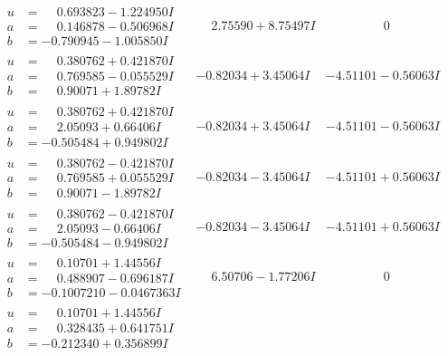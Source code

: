 \documentclass[1p]{elsarticle_modified}
\theoremstyle{definition}
\begin{document}
$$\begin{array}{c|c|c}
\begin{aligned}
u &= \phantom{-}0.693823 - 1.224950 I \\
a &= \phantom{-}0.146878 - 0.506968 I \\
b &= -0.790945 - 1.005850 I\end{aligned}
 & \phantom{-}2.75590 + 8.75497 I & \phantom{-0.000000 } 0 \\ \hline\begin{aligned}
u &= \phantom{-}0.380762 + 0.421870 I \\
a &= \phantom{-}0.769585 - 0.055529 I \\
b &= \phantom{-}0.90071 + 1.89782 I\end{aligned}
 & -0.82034 + 3.45064 I & -4.51101 - 0.56063 I \\ \hline\begin{aligned}
u &= \phantom{-}0.380762 + 0.421870 I \\
a &= \phantom{-}2.05093 + 0.66406 I \\
b &= -0.505484 + 0.949802 I\end{aligned}
 & -0.82034 + 3.45064 I & -4.51101 - 0.56063 I \\ \hline\begin{aligned}
u &= \phantom{-}0.380762 - 0.421870 I \\
a &= \phantom{-}0.769585 + 0.055529 I \\
b &= \phantom{-}0.90071 - 1.89782 I\end{aligned}
 & -0.82034 - 3.45064 I & -4.51101 + 0.56063 I \\ \hline\begin{aligned}
u &= \phantom{-}0.380762 - 0.421870 I \\
a &= \phantom{-}2.05093 - 0.66406 I \\
b &= -0.505484 - 0.949802 I\end{aligned}
 & -0.82034 - 3.45064 I & -4.51101 + 0.56063 I \\ \hline\begin{aligned}
u &= \phantom{-}0.10701 + 1.44556 I \\
a &= \phantom{-}0.488907 - 0.696187 I \\
b &= -0.1007210 - 0.0467363 I\end{aligned}
 & \phantom{-}6.50706 - 1.77206 I & \phantom{-0.000000 } 0 \\ \hline\begin{aligned}
u &= \phantom{-}0.10701 + 1.44556 I \\
a &= \phantom{-}0.328435 + 0.641751 I \\
b &= -0.212340 + 0.356899 I\end{aligned}

\end{array}$$
\end{document}
